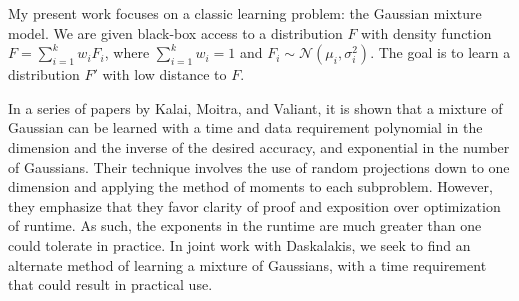 \documentclass{article}
\begin{document}
My present work focuses on a classic learning problem:
the Gaussian mixture model.
We are given black-box access to a distribution $F$
with density function $F = \sum_{i=1}^k w_iF_i$, where $\sum_{i=1}^k w_i = 1$
and $F_i \sim \mathcal{N}(\mu_i,\sigma^2_i)$.
The goal is to learn a distribution $F'$ with low distance to $F$.

In a series of papers by Kalai, Moitra, and Valiant, it is shown
that a mixture of Gaussian can be learned with a time and data
requirement polynomial in the dimension and the inverse of the desired accuracy,
and exponential in the number of Gaussians.
Their technique involves the use of random projections down to one dimension and applying
the method of moments to each subproblem.
However, they emphasize that they favor clarity of proof and exposition over
optimization of runtime.
As such, the exponents in the runtime are much greater than one could tolerate
in practice.
In joint work with Daskalakis, we seek to find an alternate method of
learning a mixture of Gaussians, with a time requirement that could
result in practical use.
\end{document}
